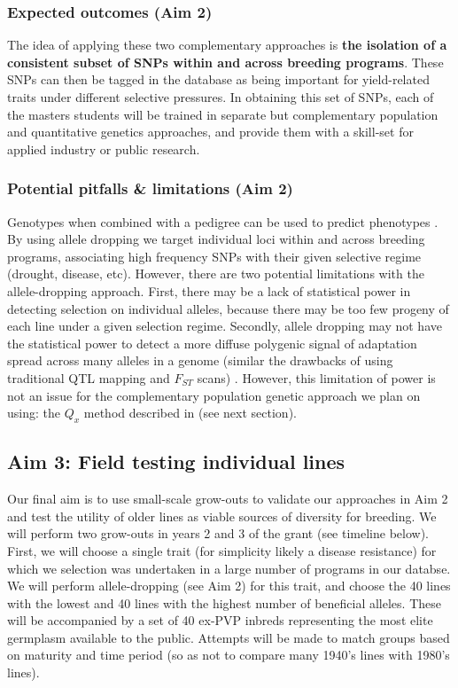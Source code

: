 \documentclass[12pt]{article}
\begin{document}
\subsubsection*{Expected outcomes (Aim 2)}

The idea of applying these two complementary approaches is \textbf{the isolation of a consistent subset of SNPs within and across breeding programs}. 
These SNPs can then be tagged in the database as being important for yield-related traits under different selective pressures.
In obtaining this set of SNPs, each of the masters students will be trained in separate but complementary population and quantitative genetics approaches, and provide them with a skill-set for applied industry or public research. 

\subsubsection*{Potential pitfalls \& limitations (Aim 2)}
Genotypes when combined with a pedigree can be used to predict phenotypes \citep{de2009predicting,crossa2010prediction,Decker:2012kd}.
By using allele dropping we target individual loci within and across breeding programs, associating high frequency SNPs with their given selective regime (drought, disease, etc). 
However, there are two potential limitations with the allele-dropping approach. First, there may be a lack of statistical power in detecting selection on individual alleles, because there may be too few progeny of each line under a given selection regime. 
Secondly, allele dropping may not have the statistical power to detect a more diffuse polygenic signal of adaptation spread across many alleles in a genome (similar the drawbacks of using traditional QTL mapping and $F_{ST}$ scans) \cite{Rockman:2011ej, Berg:2014bs}. 
However, this limitation of power is not an issue for the complementary population genetic approach we plan on using: the $Q_{x}$ method described in \cite{Berg:2014bs} (see next section). 

\subsection*{Aim 3: Field testing individual lines}

Our final aim is to use small-scale grow-outs to validate our approaches in Aim 2 and test the utility of older lines as viable sources of diversity for breeding.
We will perform two grow-outs in years 2 and 3 of the grant (see timeline below).
First, we will choose a single trait (for simplicity likely a disease resistance) for which we selection was undertaken in a large number of programs in our databse.
We will perform allele-dropping (see Aim 2) for this trait, and choose the 40 lines with the lowest and 40 lines with the highest number of beneficial alleles.
These will be accompanied by a set of 40 ex-PVP inbreds representing the most elite germplasm available to the public. 
Attempts will be made to match groups based on maturity and time period (so as not to compare many 1940's lines with 1980's lines).
\end{document}
